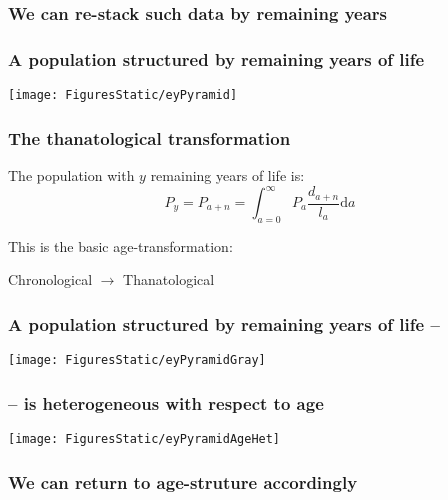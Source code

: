 \documentclass{beamer}
\begin{document}

\begin{frame}
\frametitle{We can re-stack such data by remaining years}
\end{frame}

\begin{frame}
\frametitle{A population structured by remaining years of life}
\texttt{[image: FiguresStatic/eyPyramid]}
\end{frame}

\begin{frame}
\frametitle{The thanatological transformation}
The population with $y$ remaining years of life is:
 \begin{equation}
   P_y = P_{a+n} = \int_{a=0}^\infty P_a \frac{d_{a+n}}{l_a} \mathrm{d} a
 \end{equation}
 
\pause
This is the basic age-transformation: 

Chronological $\rightarrow$ Thanatological 
\end{frame}


\begin{frame}
\frametitle{A population structured by remaining years of life --}
\texttt{[image: FiguresStatic/eyPyramidGray]}
\end{frame}


\begin{frame}
\frametitle{-- is heterogeneous with respect to age}
\texttt{[image: FiguresStatic/eyPyramidAgeHet]}
\end{frame}

\begin{frame}
\frametitle{We can return to age-struture accordingly}
\end{frame}

\end{document}
